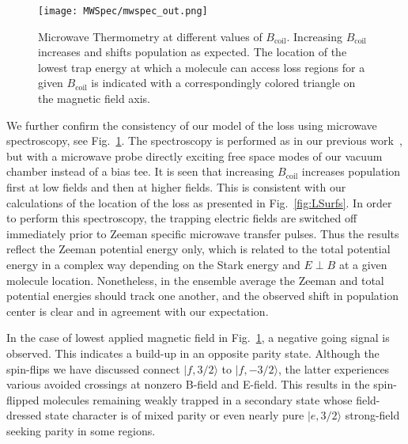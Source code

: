 \documentclass[%
 reprint,
groupedaddress,
 amsmath,amssymb,
 aps,
prl,
]{revtex4-1}
\newcommand{\epb}{{$E\!\perp\!B$}}
\begin{document}
\begin{figure}[tb]
\texttt{[image: MWSpec/mwspec\_out.png]}%
\caption{
Microwave Thermometry at different values of $B_\text{coil}$. Increasing $B_\text{coil}$ increases and shifts population as expected. The location of the lowest trap energy at which a molecule can access loss regions for a given $B_\text{coil}$ is indicated with a correspondingly colored triangle on the magnetic field axis.
\label{fig:spec}}
\end{figure}

We further confirm the consistency of our model of the loss using microwave spectroscopy, see Fig.~\ref{fig:spec}. The spectroscopy is performed as in our previous work~\cite{Stuhl2012evap}, but with a microwave probe directly exciting free space modes of our vacuum chamber instead of a bias tee. It is seen that increasing $B_{\text{coil}}$ increases population first at low fields and then at higher fields. This is consistent with our calculations of the location of the loss as presented in Fig.~\ref{fig:LSurfs}. In order to perform this spectroscopy, the trapping electric fields are switched off immediately prior to Zeeman specific microwave transfer pulses. Thus the results reflect the Zeeman potential energy only, which is related to the total potential energy in a complex way depending on the Stark energy and \epb{} at a given molecule location. Nonetheless, in the ensemble average the Zeeman and total potential energies should track one another, and the observed shift in population center is clear and in agreement with our expectation. %


In the case of lowest applied magnetic field in Fig.~\ref{fig:spec}, a negative going signal is observed. This indicates a build-up in an opposite parity state. Although the spin-flips we have discussed connect $|f,3/2\rangle$ to $|f,-3/2\rangle$, the latter experiences various avoided crossings at nonzero B-field and E-field. This results in the spin-flipped molecules remaining weakly trapped in a secondary state whose field-dressed state character is of mixed parity or even nearly pure $|e,3/2\rangle$ strong-field seeking parity in some regions. %
\end{document}
